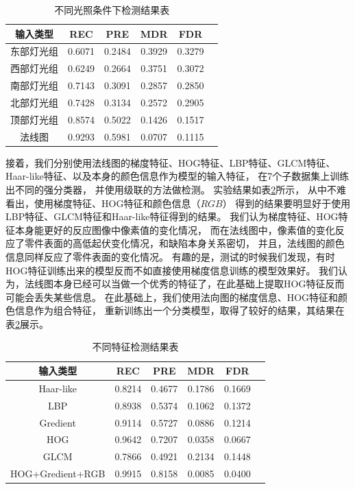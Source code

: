 \begin{table}
\centering
\begin{tabular}{cccccp{38mm}}
\toprule
\textbf{输入类型} & \textbf{REC} & \textbf{PRE} & \textbf{MDR} & \textbf{FDR}\\
\midrule
\mbox{东部灯光组} & 0.6071 & 0.2484 & 0.3929 & 0.3279\\
\mbox{西部灯光组} & 0.6249 & 0.2664 & 0.3751 & 0.3072\\
\mbox{南部灯光组} & 0.7143 & 0.3091 & 0.2857 & 0.2850\\
\mbox{北部灯光组} & 0.7428 & 0.3134 & 0.2572 & 0.2905\\
\mbox{顶部灯光组} & 0.8574 & 0.5022 & 0.1426 & 0.1517\\
\mbox{法线图} & 0.9293 & 0.5981 & 0.0707 & 0.1115\\
\bottomrule
\end{tabular}
\caption{不同光照条件下检测结果表}
\label{tab:butongguanzhaojiancejieguo}
\end{table}

接着，我们分别使用法线图的梯度特征、HOG特征、LBP特征、GLCM特征、Haar-like特征、以及本身的颜色信息作为模型的输入特征，
在7个子数据集上训练出不同的强分类器，
并使用级联的方法做检测。
实验结果如表\ref{tab:butongtezhengjieguobiao}所示，
从中不难看出，使用梯度特征、HOG特征和颜色信息（$RGB$）
得到的结果要明显好于使用LBP特征、GLCM特征和Haar-like特征得到的结果。
我们认为梯度特征、HOG特征本身能更好的反应图像中像素值的变化情况，
而在法线图中，像素值的变化反应了零件表面的高低起伏变化情况，和缺陷本身关系密切，
并且，法线图的颜色信息同样反应了零件表面的变化情况。
有趣的是，测试的时候我们发现，有时HOG特征训练出来的模型反而不如直接使用梯度信息训练的模型效果好。
我们认为，法线图本身已经可以当做一个优秀的特征了，在此基础上提取HOG特征反而可能会丢失某些信息。
在此基础上，我们使用法向图的梯度信息、HOG特征和颜色信息作为组合特征，
重新训练出一个分类模型，取得了较好的结果，其结果在表\ref{tab:butongtezhengjieguobiao}展示。

\begin{table}
\centering
\begin{tabular}{cccccp{38mm}}
\toprule
\textbf{输入类型} & \textbf{REC} & \textbf{PRE} & \textbf{MDR} & \textbf{FDR}\\
\midrule
\mbox{Haar-like} & 0.8214 & 0.4677 & 0.1786 & 0.1669\\
\mbox{LBP} & 0.8938 & 0.5374 & 0.1062 & 0.1372\\
\mbox{Gredient} & 0.9114 & 0.5727 & 0.0886 & 0.1214\\
\mbox{HOG} & 0.9642 & 0.7207 & 0.0358 & 0.0667\\
\mbox{GLCM} & 0.7866 & 0.4921 & 0.2134 & 0.1448\\
\mbox{HOG+Gredient+RGB} & 0.9915 & 0.8158 & 0.0085 & 0.0400\\
\bottomrule
\end{tabular}
\caption{不同特征检测结果表}
\label{tab:butongtezhengjieguobiao}
\end{table}

